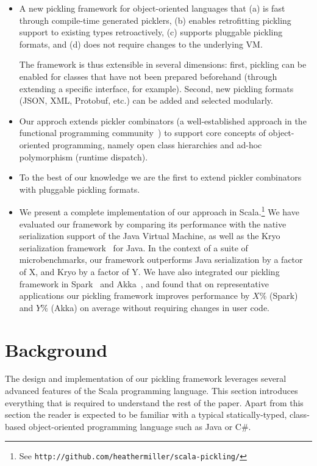 \documentclass[preprint,10pt]{sigplanconf}
\begin{document}
\begin{itemize}

\item A new pickling framework for object-oriented languages that (a)
  is fast through compile-time generated picklers, (b) enables
  retrofitting pickling support to existing types retroactively, (c)
  supports pluggable pickling formats, and (d) does not require
  changes to the underlying VM.

  The framework is thus extensible in several dimensions: first,
  pickling can be enabled for classes that have not been prepared
  beforehand (through extending a specific interface, for
  example). Second, new pickling formats (JSON, XML, Protobuf, etc.)
  can be added and selected modularly.

\item Our approch extends pickler combinators (a well-established
  approach in the functional programming
  community~\cite{Kennedy,Elsman}) to support core concepts of
  object-oriented programming, namely open class hierarchies and
  ad-hoc polymorphism (runtime dispatch).

\item To the best of our knowledge we are the first to extend pickler
  combinators with pluggable pickling formats.

\item We present a complete implementation of our approach in
  Scala.\footnote{See
    \texttt{http://github.com/heathermiller/scala-pickling/}} We have
  evaluated our framework by comparing its performance with the native
  serialization support of the Java Virtual Machine, as well as the
  Kryo serialization framework~\cite{Kryo} for Java. In the context of
  a suite of microbenchmarks, our framework outperforms Java
  serialization by a factor of X, and Kryo by a factor of Y. We have
  also integrated our pickling framework in Spark~\cite{Zaharia2010}
  and Akka~\cite{Akka}, and found that on representative applications
  our pickling framework improves performance by $X \%$ (Spark) and $Y
  \%$ (Akka) on average without requiring changes in user code.

\end{itemize}


\section{Background}

The design and implementation of our pickling framework leverages
several advanced features of the Scala programming language. This
section introduces everything that is required to understand the rest
of the paper. Apart from this section the reader is expected to be
familiar with a typical statically-typed, class-based object-oriented
programming language such as Java or C\#.
\end{document}
